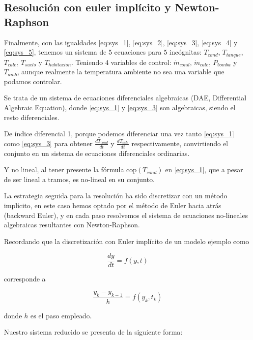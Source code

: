 \subsection{Resolución con euler implícito y Newton-Raphson}

Finalmente, con las igualdades \eqref{eq:sys_1}, \eqref{eq:sys_2},
\eqref{eq:sys_3}, \eqref{eq:sys_4} y \eqref{eq:sys_5}, tenemos un sistema de 5
ecuaciones para 5 incógnitas: $T_{cond}$, $T_{tanque}$, $T_{cale}$, $T_{suelo}$
y $T_{habitacion}$. Teniendo 4 variables de control: $\dot{m}_{cond}$,
$\dot{m}_{cale}$, $P_{bomba}$ y $T_{amb}$, aunque realmente la temperatura
ambiente no sea una variable que podamos controlar.

Se trata de un sistema de ecuaciones diferenciales algebraicas (DAE,
Differential Algebraic Equation), donde \eqref{eq:sys_1} y \eqref{eq:sys_3} son
algebraicas, siendo el resto diferenciales.

De índice diferencial 1, porque podemos diferenciar una vez tanto
\eqref{eq:sys_1} como \eqref{eq:sys_3} para obtener $\frac{dT_{cond}}{dt}$ y
$\frac{dT_{cale}}{dt}$ respectivamente, convirtiendo el conjunto en un sistema
de ecuaciones diferenciales ordinarias.

Y no lineal, al tener presente la fórmula $\text{cop}(T_{cond})$ en
\eqref{eq:sys_1}, que a pesar de ser lineal a tramos, es no-lineal en su
conjunto.

La estrategia seguida para la resolución ha sido discretizar con un método
implícito, en este caso hemos optado por el método de Euler hacia atrás
(backward Euler), y en cada paso resolvemos el sistema de ecuaciones
no-lineales algebraicas resultantes con Newton-Raphson.

Recordando que la discretización con Euler implícito de un modelo ejemplo como

\begin{equation}
	\frac{dy}{dt} = f(y, t)
\end{equation}

corresponde a

\begin{equation}
	\frac{y_k - y_{k-1}}{h} = f(y_k, t_k)
\end{equation}

donde $h$ es el paso empleado.

Nuestro sistema reducido se presenta de la siguiente forma:

